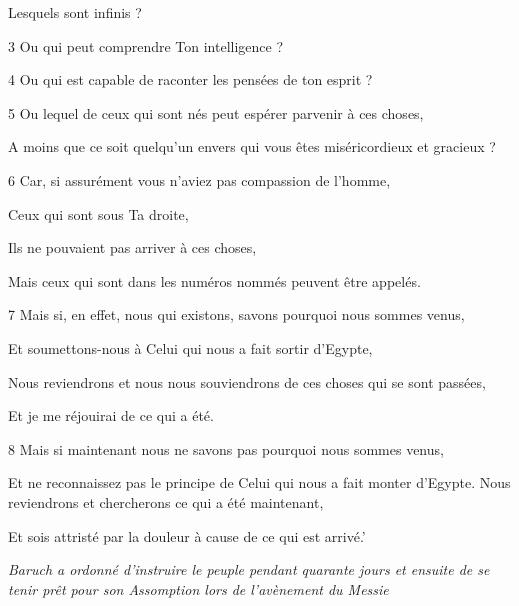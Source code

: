 \par Lesquels sont infinis ?

\par 3 Ou qui peut comprendre Ton intelligence ?

\par 4 Ou qui est capable de raconter les pensées de ton esprit ?

\par 5 Ou lequel de ceux qui sont nés peut espérer parvenir à ces choses,

\par A moins que ce soit quelqu'un envers qui vous êtes miséricordieux et gracieux ?

\par 6 Car, si assurément vous n'aviez pas compassion de l'homme,

\par Ceux qui sont sous Ta droite,

\par Ils ne pouvaient pas arriver à ces choses,

\par Mais ceux qui sont dans les numéros nommés peuvent être appelés.

\par 7 Mais si, en effet, nous qui existons, savons pourquoi nous sommes venus,

\par Et soumettons-nous à Celui qui nous a fait sortir d'Egypte,

\par Nous reviendrons et nous nous souviendrons de ces choses qui se sont passées,

\par Et je me réjouirai de ce qui a été.

\par 8 Mais si maintenant nous ne savons pas pourquoi nous sommes venus,

\par Et ne reconnaissez pas le principe de Celui qui nous a fait monter d'Egypte. Nous reviendrons et chercherons ce qui a été maintenant,

\par Et sois attristé par la douleur à cause de ce qui est arrivé.'


\par \textit{Baruch a ordonné d'instruire le peuple pendant quarante jours et ensuite de se tenir prêt pour son Assomption lors de l'avènement du Messie}

